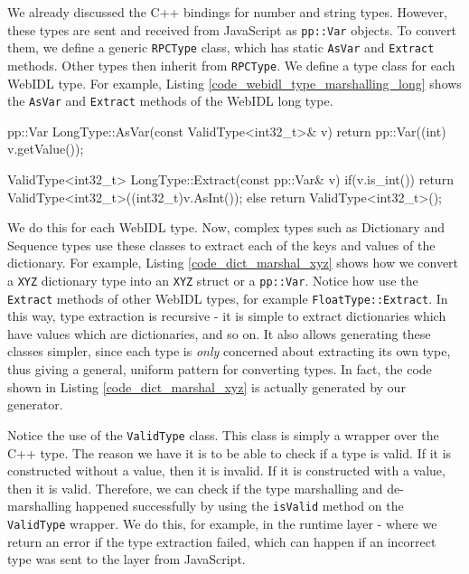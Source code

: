 We already discussed the C++ bindings for number and string types. However, these types are sent and received from JavaScript as \lstinline{pp::Var} objects. To convert them, we define a generic \lstinline{RPCType} class, which has static \lstinline{AsVar} and \lstinline{Extract} methods. Other types then inherit from \lstinline{RPCType}. We define a type class for each WebIDL type. For example, Listing \ref{code_webidl_type_marshalling_long} shows the \lstinline{AsVar} and \lstinline{Extract} methods of the WebIDL long type.

\begin{code}
pp::Var LongType::AsVar(const ValidType<int32_t>& v){
  return pp::Var((int) v.getValue());
}

ValidType<int32_t> LongType::Extract(const pp::Var& v){
  if(v.is_int()){
    return ValidType<int32_t>((int32_t)v.AsInt());
  } else {
    return ValidType<int32_t>();
  }
}
\end{code}

We do this for each WebIDL type. Now, complex types such as Dictionary and Sequence types use these classes to extract each of the keys and values of the dictionary. For example, Listing \ref{code_dict_marshal_xyz} shows how we convert a \lstinline{XYZ} dictionary type into an \lstinline{XYZ} struct or a \lstinline{pp::Var}. Notice how use the \lstinline{Extract} methods of other WebIDL types, for example \lstinline{FloatType::Extract}. In this way, type extraction is recursive - it is simple to extract dictionaries which have values which are dictionaries, and so on. It also allows generating these classes simpler, since each type is \emph{only} concerned about extracting its own type, thus giving a general, uniform pattern for converting types. In fact, the code shown in Listing \ref{code_dict_marshal_xyz} is actually generated by our generator.

Notice the use of the \lstinline{ValidType} class. This class is simply a wrapper over the C++ type. The reason we have it is to be able to check if a type is valid. If it is constructed without a value, then it is invalid. If it is constructed with a value, then it is valid. Therefore, we can check if the type marshalling and de-marshalling happened successfully by using the \lstinline{isValid} method on the \lstinline{ValidType} wrapper. We do this, for example, in the runtime layer - where we return an error if the type extraction failed, which can happen if an incorrect type was sent to the layer from JavaScript.

